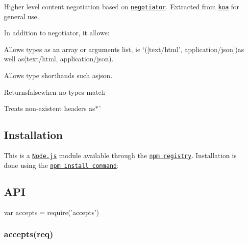 \href{https://npmjs.org/package/accepts}{\tt } \href{https://npmjs.org/package/accepts}{\tt } \href{https://nodejs.org/en/download/}{\tt } \href{https://travis-ci.org/jshttp/accepts}{\tt } \href{https://coveralls.io/r/jshttp/accepts}{\tt }

Higher level content negotiation based on \href{https://www.npmjs.com/package/negotiator}{\tt negotiator}. Extracted from \href{https://www.npmjs.com/package/koa}{\tt koa} for general use.

In addition to negotiator, it allows\+:


\begin{DoxyItemize}
\item Allows types as an array or arguments list, ie `(\mbox{[}\textquotesingle{}text/html', \textquotesingle{}application/json\textquotesingle{}\mbox{]}){\ttfamily  as well as}(\textquotesingle{}text/html\textquotesingle{}, \textquotesingle{}application/json\textquotesingle{}){\ttfamily .}
\item {\ttfamily Allows type shorthands such as}json{\ttfamily .}
\item {\ttfamily Returns}false{\ttfamily when no types match}
\item {\ttfamily Treats non-\/existent headers as}$\ast$\`{}
\end{DoxyItemize}

\subsection*{Installation}

This is a \href{https://nodejs.org/en/}{\tt Node.\+js} module available through the \href{https://www.npmjs.com/}{\tt npm registry}. Installation is done using the \href{https://docs.npmjs.com/getting-started/installing-npm-packages-locally}{\tt {\ttfamily npm install} command}\+:




\subsection*{A\+PI}


\begin{DoxyCode}
var accepts = require('accepts')
\end{DoxyCode}


\subsubsection*{accepts(req)}

